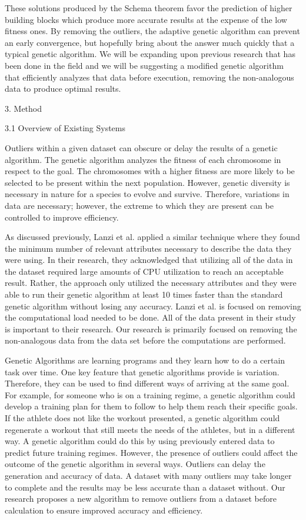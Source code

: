 \documentclass[conference]{IEEEtran}
\begin{document}
\large These solutions produced by the Schema theorem favor the prediction of higher building blocks which produce more accurate results at the expense of the low fitness ones. By removing the outliers, the adaptive genetic algorithm can prevent an early convergence, but hopefully bring about the answer much quickly that a typical genetic algorithm. We will be expanding upon previous research that has been done in the field and we will be suggesting a modified genetic algorithm that efficiently analyzes that data before execution, removing the non-analogous data to produce optimal results. 

3. Method

3.1 Overview of Existing Systems

Outliers within a given dataset can obscure or delay the results of a genetic algorithm. The genetic algorithm analyzes the fitness of each chromosome in respect to the goal. The chromosomes with a higher fitness are more likely to be selected to be present within the next population. However, genetic diversity is necessary in nature for a species to evolve and survive. Therefore, variations in data are necessary; however, the extreme to which they are present can be controlled to improve efficiency.

As discussed previously, Lanzi et al. applied a similar technique where they found the minimum number of relevant attributes necessary to describe the data they were using. In their research, they acknowledged that utilizing all of the data in the dataset required large amounts of CPU utilization to reach an acceptable result. Rather, the approach only utilized the necessary attributes and they were able to run their genetic algorithm at least 10 times faster than the standard genetic algorithm without losing any accuracy. Lanzi et al. is focused on removing the computational load needed to be done. All of the data present in their study is important to their research. Our research is primarily focused on removing the non-analogous data from the data set before the computations are performed.

Genetic Algorithms are learning programs and they learn how to do a certain task over time. One key feature that genetic algorithms provide is variation. Therefore, they can be used to find different ways of arriving at the same goal. For example, for someone who is on a training regime, a genetic algorithm could develop a training plan for them to follow to help them reach their specific goals. If the athlete does not like the workout presented, a genetic algorithm could regenerate a workout that still meets the needs of the athletes, but in a different way. A genetic algorithm could do this by using previously entered data to predict future training regimes. However, the presence of outliers could affect the outcome of the genetic algorithm in several ways. Outliers can delay the generation and accuracy of data. A dataset with many outliers may take longer to complete and the results may be less accurate than a dataset without. Our research proposes a new algorithm to remove outliers from a dataset before calculation to ensure improved accuracy and efficiency. 
\end{document}
